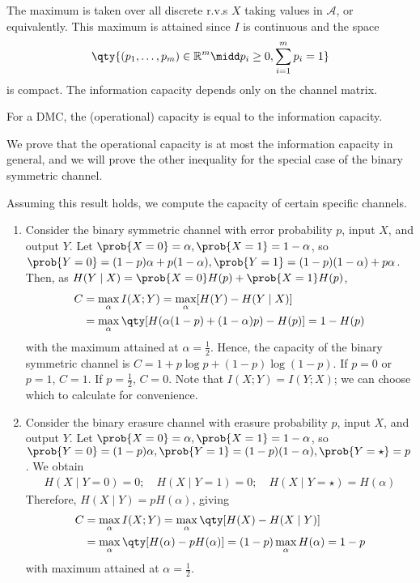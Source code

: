 The maximum is taken over all discrete r.v.s $X$ taking values in $\mathcal A$, or equivalently.
This maximum is attained since $I$ is continuous and the space
\begin{align*}
        \qty{(p_1, \dots, p_m) \in \mathbb R^m \midd p_i \geq 0, \sum_{i=1}^m p_i = 1}
    \end{align*}
is compact.
The information capacity depends only on the channel matrix.

\begin{theorem}
    For a DMC, the (operational) capacity is equal to the information capacity.
\end{theorem}

We prove that the operational capacity is at most the information capacity in general, and we will prove the other inequality for the special case of the binary symmetric channel.

\begin{example}
    Assuming this result holds, we compute the capacity of certain specific channels.
    \begin{enumerate}
        \item Consider the binary symmetric channel with error probability $p$, input $X$, and output $Y$.
        Let $\prob{X = 0} = \alpha, \prob{X = 1} = 1 - \alpha$, so $\prob{Y = 0} = (1-p)\alpha + p(1-\alpha), \prob{Y = 1} = (1-p)(1-\alpha) + p\alpha$.
        Then, as $H(Y \mid X) = \prob{X=0} H(p) + \prob{X = 1} H(p)$,
        \begin{align*}
            C &= \max_\alpha I(X;Y) = \max_\alpha [H(Y) - H(Y\mid X)] \\
            &= \max_\alpha \qty[H(\alpha(1-p) + (1-\alpha)p) - H(p)] = 1 - H(p)
       \end{align*}
        with the maximum attained at $\alpha = \frac{1}{2}$.
        Hence, the capacity of the binary symmetric channel is $C = 1 + p \log p + (1-p) \log (1-p)$.
        If $p = 0$ or $p = 1$, $C = 1$.
        If $p = \frac{1}{2}$, $C = 0$.
        Note that $I(X;Y) = I(Y;X)$; we can choose which to calculate for convenience.
        \item Consider the binary erasure channel with erasure probability $p$, input $X$, and output $Y$.
        Let $\prob{X = 0} = \alpha, \prob{X = 1} = 1 - \alpha$, so $\prob{Y = 0} = (1-p)\alpha, \prob{Y = 1} = (1-p)(1-\alpha), \prob{Y = \star} = p$.
        We obtain
        \begin{align*}
        H(X \mid Y = 0) = 0;\quad H(X \mid Y = 1) = 0;\quad H(X \mid Y = \star) = H(\alpha)
    \end{align*}
        Therefore, $H(X \mid Y) = pH(\alpha)$, giving
        \begin{align*}
            C &= \max_\alpha I(X;Y) = \max_\alpha \qty[H(X) - H(X \mid Y)] \\
            &= \max_\alpha \qty[H(\alpha) - pH(\alpha)] = (1-p) \max_\alpha H(\alpha) = 1-p
       \end{align*}
        with maximum attained at $\alpha = \frac{1}{2}$.
    \end{enumerate}
\end{example}

